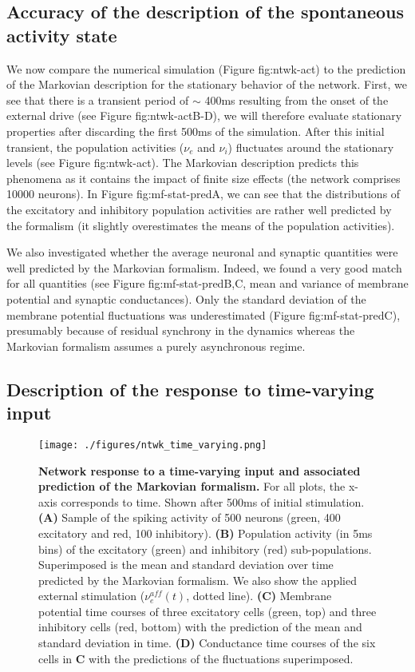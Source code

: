 \documentclass[8pt, colorlinks, a4paper]{article}
\renewcommand\ref{}
\begin{document}
\subsection{Accuracy of the description of the spontaneous activity state}
\label{sec-4-5}

We now compare the numerical simulation (Figure \ref{fig:ntwk-act}) to
the prediction of the Markovian description for the stationary
behavior of the network. First, we see that there is a transient
period of \(\sim\) 400ms resulting from the onset of the external
drive (see Figure \ref{fig:ntwk-act}B-D), we will therefore evaluate
stationary properties after discarding the first 500ms of the
simulation. After this initial transient, the population activities
(\(\nu_e\) and \(\nu_i\)) fluctuates around the stationary levels (see
Figure \ref{fig:ntwk-act}). The Markovian description predicts this
phenomena as it contains the impact of finite size effects (the
network comprises 10000 neurons). In Figure \ref{fig:mf-stat-pred}A,
we can see that the distributions of the excitatory and inhibitory
population activities are rather well predicted by the formalism (it
slightly overestimates the means of the population activities).

We also investigated whether the average neuronal and synaptic
quantities were well predicted by the Markovian formalism. Indeed, we
found a very good match for all quantities (see Figure
\ref{fig:mf-stat-pred}B,C, mean and variance of membrane potential and
synaptic conductances). Only the standard deviation of the membrane
potential fluctuations was underestimated (Figure \ref{fig:mf-stat-pred}C),
presumably because of residual synchrony in the dynamics whereas the
Markovian formalism assumes a purely asynchronous regime.

\subsection{Description of the response to time-varying input}
\label{sec-4-6}

\begin{figure}[tb!]
\centering
\texttt{[image: ./figures/ntwk\_time\_varying.png]}
\caption{\label{fig:mf-temp-pred}\textbf{Network response to a
    time-varying input and associated prediction of the Markovian
    formalism.} For all plots, the x-axis corresponds to time. Shown
  after 500ms of initial stimulation. \textbf{(A)} Sample of the
  spiking activity of 500 neurons (green, 400 excitatory and red, 100
  inhibitory). \textbf{(B)} Population activity (in 5ms bins) of the
  excitatory (green) and inhibitory (red)
  sub-populations. Superimposed is the mean and standard deviation
  over time predicted by the Markovian formalism. We also show the
  applied external stimulation (\(\nu_e^{aff}(t)\), dotted
  line). \textbf{(C)} Membrane potential time courses of three
  excitatory cells (green, top) and three inhibitory cells (red,
  bottom) with the prediction of the mean and standard deviation in
  time. \textbf{(D)} Conductance time courses of the six cells in
  \textbf{C} with the predictions of the fluctuations superimposed.}
\end{figure}
\end{document}
